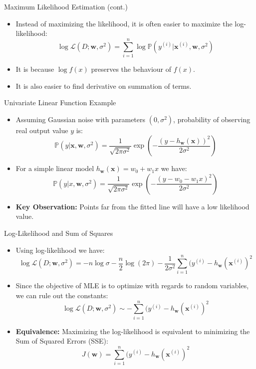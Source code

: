 \documentclass[serif, aspectratio=169]{beamer}
\begin{document}
\begin{frame}{Maximum Likelihood Estimation (cont.)}
    \begin{itemize}
        \item Instead of maximizing the likelihood, it is often easier to maximize the log-likelihood:
        \[
        \log \mathcal{L}(D; \mathbf{w}, \sigma^2) = \sum_{i=1}^n \log  \mathbb{P}(y^{(i)} | \mathbf{x}^{(i)}, \mathbf{w}, \sigma^2)
        \]
        \item It is because \( \log f(x) \) preserves the behaviour of \( f(x) \).
        \item It is also easier to find derivative on summation of terms.
    \end{itemize}
\end{frame}

\begin{frame}{Univariate Linear Function Example}
    \begin{itemize}
        \item Assuming Gaussian noise with parameters \( (0, \sigma^2) \), probability of observing real output value \( y \) is:
        \[
        \mathbb{P}(y | \mathbf{x}, \mathbf{w}, \sigma^2) = \frac{1}{\sqrt{2\pi \sigma^2}} \exp \left( - \frac{(y - h_{\mathbf{w}}(\mathbf{x} ))^2}{2\sigma^2} \right)
        \]

        \item For a simple linear model \( h_{\mathbf{w}}(\mathbf{x} ) = w_0 + w_1 x \) we have:
        \[
        \mathbb{P}(y | x, \mathbf{w}, \sigma^2) = \frac{1}{\sqrt{2\pi \sigma^2}} \exp \left( - \frac{(y - w_0 - w_1 x)^2}{2\sigma^2} \right)
        \]
        \item \textbf{Key Observation:} Points far from the fitted line will have a low likelihood value.
    \end{itemize}
\end{frame}

\begin{frame}{Log-Likelihood and Sum of Squares}
    \begin{itemize}
        \item Using log-likelihood we have:
        \[
        \log \mathcal{L}(D; \mathbf{w}, \sigma^2) = -n \log \sigma - \frac{n}{2} \log(2\pi) - \frac{1}{2\sigma^2} \sum_{i=1}^n (y^{(i)} - h_{\mathbf{w}}(\mathbf{x}^{(i)})^2
        \]
        \item Since the objective of MLE is to optimize with regards to random variables, we can rule out the constants:
        \[
        \log \mathcal{L}(D; \mathbf{w}, \sigma^2) \sim - \sum_{i=1}^n (y^{(i)} - h_{\mathbf{w}}(\mathbf{x}^{(i)})^2
        \]
        \item \textbf{Equivalence:} Maximizing the log-likelihood is equivalent to minimizing the Sum of Squared Errors (SSE):
        \[
        J(\mathbf{w}) = \sum_{i=1}^n (y^{(i)} - h_{\mathbf{w}}(\mathbf{x}^{(i)})^2
        \]
    \end{itemize}
\end{frame}
\end{document}
